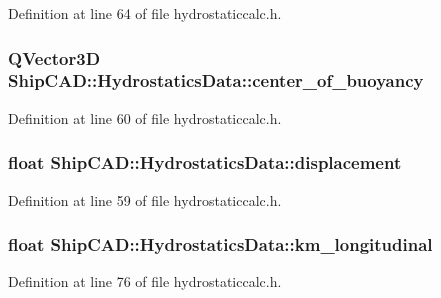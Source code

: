 Definition at line 64 of file hydrostaticcalc.\-h.

\hypertarget{structShipCAD_1_1HydrostaticsData_a316b31598f53f036c7008cc4910293f8}{
\subsubsection[{center\-\_\-of\-\_\-buoyancy}]{\setlength{\rightskip}{0pt plus 5cm}Q\-Vector3\-D Ship\-C\-A\-D\-::\-Hydrostatics\-Data\-::center\-\_\-of\-\_\-buoyancy}}\label{structShipCAD_1_1HydrostaticsData_a316b31598f53f036c7008cc4910293f8}


Definition at line 60 of file hydrostaticcalc.\-h.

\hypertarget{structShipCAD_1_1HydrostaticsData_a92d1a8a97eb9b21bad485e40ac4461a0}{
\subsubsection[{displacement}]{\setlength{\rightskip}{0pt plus 5cm}float Ship\-C\-A\-D\-::\-Hydrostatics\-Data\-::displacement}}\label{structShipCAD_1_1HydrostaticsData_a92d1a8a97eb9b21bad485e40ac4461a0}


Definition at line 59 of file hydrostaticcalc.\-h.

\hypertarget{structShipCAD_1_1HydrostaticsData_a0a51e62f7d169fa892eaabc6a1937256}{
\subsubsection[{km\-\_\-longitudinal}]{\setlength{\rightskip}{0pt plus 5cm}float Ship\-C\-A\-D\-::\-Hydrostatics\-Data\-::km\-\_\-longitudinal}}\label{structShipCAD_1_1HydrostaticsData_a0a51e62f7d169fa892eaabc6a1937256}


Definition at line 76 of file hydrostaticcalc.\-h.

